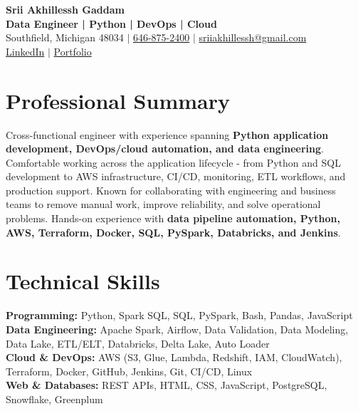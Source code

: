 \documentclass[letterpaper,10pt]{article}
\begin{document}
\fontsize{9.35pt}{10.45pt}\selectfont

\begin{center}
    {\LARGE \textbf{Srii Akhillessh Gaddam}} \\[-1pt]
    \textbf{Data Engineer | Python | DevOps | Cloud} \\[2pt]
    Southfield, Michigan 48034 $|$
    \href{tel:6468752400}{646-875-2400} $|$
    \href{mailto:sriiakhillessh@gmail.com}{sriiakhillessh@gmail.com} \\[1pt]
    \href{https://www.linkedin.com/in/srii-akhiilessh-gaddam-b48668191/}{LinkedIn} $|$
    \href{https://sriiakhillesshg.github.io/portfolio/}{Portfolio}
\end{center}
\vspace{-8pt}

\section{Professional Summary}
\small{Cross-functional engineer with experience spanning \textbf{Python application development, DevOps/cloud automation, and data engineering}. Comfortable working across the application lifecycle - from Python and SQL development to AWS infrastructure, CI/CD, monitoring, ETL workflows, and production support. Known for collaborating with engineering and business teams to remove manual work, improve reliability, and solve operational problems. Hands-on experience with \textbf{data pipeline automation, Python, AWS, Terraform, Docker, SQL, PySpark, Databricks, and Jenkins}.}

\section{Technical Skills}
\small{
\textbf{Programming:} Python, Spark SQL, SQL, PySpark, Bash, Pandas, JavaScript \\
\textbf{Data Engineering:} Apache Spark, Airflow, Data Validation, Data Modeling, Data Lake, ETL/ELT, Databricks, Delta Lake, Auto Loader \\
\textbf{Cloud \& DevOps:} AWS (S3, Glue, Lambda, Redshift, IAM, CloudWatch), Terraform, Docker, GitHub, Jenkins, Git, CI/CD, Linux \\
\textbf{Web \& Databases:} REST APIs, HTML, CSS, JavaScript, PostgreSQL, Snowflake, Greenplum
}
\end{document}

